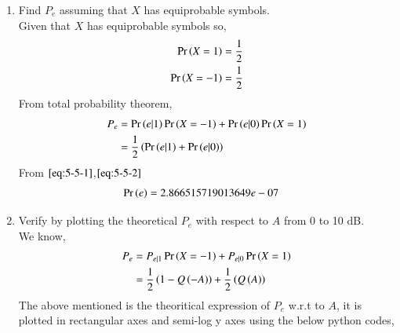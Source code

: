 \documentclass[journal,12pt,twocolumn]{IEEEtran}
\renewcommand\thesection{\arabic{section}}
\begin{document}
\begin{enumerate}[label=\thesection.\arabic*,ref=\thesection.\theenumi]
\begin{enumerate}[label=\thesection.\arabic*
,ref=\thesection.\theenumi]
\begin{align}
	  P_{e|1} &= \pr{\hat{X} = 1|X=-1}\\
                  &= \pr{ Y > 0| X=-1}\\
                  &= \pr{AX + N > 0 | X=1}\\
                  &= \pr{ N-A > 0}\\
                  &= \pr{N > A}\\
		  &= 1 - F_{N}\brak{A}\\
		  &= Q\brak{A}\\
		  &= 2.866515719235352e-07\label{eq:5-5-2}
  \end{align}
The above calculations are coded in below python file,
  \begin{lstlisting}
    wget  https://github.com/Charanyash/Random-Numbers-/tree/main/codes/Q5/5.5.py
  \end{lstlisting}
  Run the following command
  \begin{lstlisting}
   python3 5.5.py
  \end{lstlisting}
\item Find $P_e$ assuming that $X$ has equiprobable symbols.\\
 \solution Given that $X$ has equiprobable symbols so,
   \begin{align}
	   \Pr\left(X = 1\right) &= \frac{1}{2}\\
	   \Pr\left(X=-1\right)  &= \frac{1}{2}
   \end{align}
   	From total probability theorem,
   \begin{align}
	   P_{e} &= \Pr\left(e|1\right)\Pr\left(X = -1\right) + \Pr\left(e|0\right)\Pr\left(X=1\right)\\
		       &= \frac{1}{2}\left(\Pr\left(e|1\right) + \Pr\left(e|0\right)\right)
   \end{align}
From $\eqref{eq:5-5-1}$,$\eqref{eq:5-5-2}$
   \begin{align}
	   \Pr\left(e\right) &= 2.866515719013649e-07 
   \end{align}
\item
Verify by plotting  the theoretical $P_e$ with respect to $A$ from 0 to 10 dB.\\
 \solution
   We know,
     \begin{align}
	     P_e  &= P_{e|1}\Pr\left(X = -1\right) + P_{e|0}\Pr\left(X=1\right) \\
		  &= \frac{1}{2}\left( 1 - Q\left(-A\right)\right) + \frac{1}{2}\left(Q\left(A\right)\right)
     \end{align}
    The above mentioned is the theoritical expression of $P_e$ w.r.t to $A$, it is plotted in rectangular axes and semi-log y axes using the below python codes,
    \begin{lstlisting}

\end{lstlisting}
\end{enumerate}
\end{enumerate}
\end{document}
